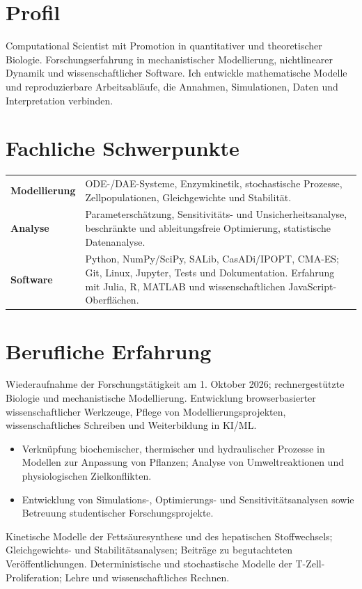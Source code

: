 
\section{Profil}
Computational Scientist mit Promotion in quantitativer und theoretischer Biologie. Forschungserfahrung in mechanistischer Modellierung, nichtlinearer Dynamik und wissenschaftlicher Software. Ich entwickle mathematische Modelle und reproduzierbare Arbeitsabläufe, die Annahmen, Simulationen, Daten und Interpretation verbinden.
\section{Fachliche Schwerpunkte}
\begin{tabularx}{\linewidth}{@{}p{35mm}X@{}}
\textbf{Modellierung} & ODE-/DAE-Systeme, Enzymkinetik, stochastische Prozesse, Zellpopulationen, Gleichgewichte und Stabilität.\\[5pt]
\textbf{Analyse} & Parameterschätzung, Sensitivitäts- und Unsicherheitsanalyse, beschränkte und ableitungsfreie Optimierung, statistische Datenanalyse.\\[5pt]
\textbf{Software} & Python, NumPy/SciPy, SALib, CasADi/IPOPT, CMA-ES; Git, Linux, Jupyter, Tests und Dokumentation. Erfahrung mit Julia, R, MATLAB und wissenschaftlichen JavaScript-Oberflächen.
\end{tabularx}
\section{Berufliche Erfahrung}
Wiederaufnahme der Forschungstätigkeit am 1. Oktober 2026; rechnergestützte Biologie und mechanistische Modellierung.
Entwicklung browserbasierter wissenschaftlicher Werkzeuge, Pflege von Modellierungsprojekten, wissenschaftliches Schreiben und Weiterbildung in KI/ML.
\begin{itemize}
\item Verknüpfung biochemischer, thermischer und hydraulischer Prozesse in Modellen zur Anpassung von Pflanzen; Analyse von Umweltreaktionen und physiologischen Zielkonflikten.
\item Entwicklung von Simulations-, Optimierungs- und Sensitivitätsanalysen sowie Betreuung studentischer Forschungsprojekte.
\end{itemize}
Kinetische Modelle der Fettsäuresynthese und des hepatischen Stoffwechsels; Gleichgewichts- und Stabilitätsanalysen; Beiträge zu begutachteten Veröffentlichungen.
\newpage{}
Deterministische und stochastische Modelle der T-Zell-Proliferation; Lehre und wissenschaftliches Rechnen.
